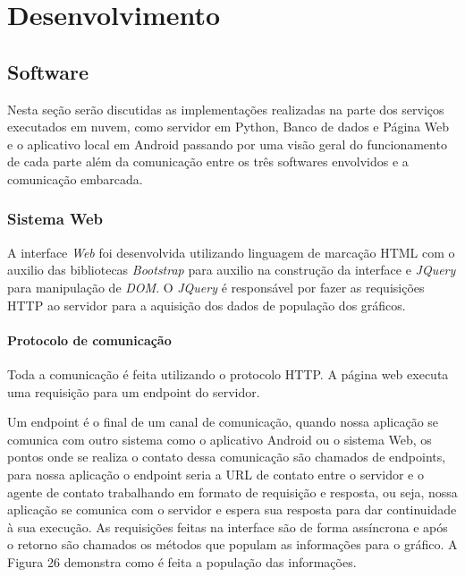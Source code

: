 \chapter{Desenvolvimento} \label{cap:desenvolvimento}


\section{Software}
Nesta seção serão discutidas as implementações realizadas na parte dos serviços executados em nuvem, como servidor em Python, Banco de dados e Página Web e o aplicativo local em Android passando por uma visão geral do funcionamento de cada parte além da comunicação entre os três softwares envolvidos e a comunicação embarcada.


\subsection{\textbf{Sistema Web}}

A interface \textit{Web} foi desenvolvida utilizando linguagem de marcação HTML com o auxilio das bibliotecas \textit{Bootstrap} para auxilio na construção da interface e \textit{JQuery} para manipulação de \textit{DOM}. O \textit{JQuery} é responsável por fazer as requisições HTTP ao servidor para a aquisição dos dados de população dos gráficos.

\subsubsection{Protocolo de comunicação}

Toda a comunicação é feita utilizando o protocolo HTTP. A página web executa uma requisição para um endpoint do servidor.

 Um endpoint é o final de um canal de comunicação, quando nossa aplicação se comunica com outro sistema como o aplicativo Android ou o sistema Web, os pontos onde se realiza o contato dessa comunicação são chamados de endpoints, para nossa aplicação o endpoint seria a URL de contato entre o servidor e o agente de contato trabalhando em formato de requisição e resposta, ou seja, nossa aplicação se comunica com o servidor e espera sua resposta para dar continuidade à sua execução. As requisições feitas na interface são de forma assíncrona e após o retorno são chamados os métodos que populam as informações para o gráfico. A Figura 26 demonstra como é feita a população das informações.


